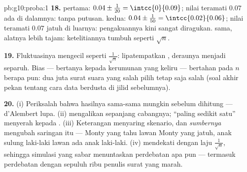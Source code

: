 \begin{solution}{pb:g10:proba:1}
\textbf{18.}  pertama:  $0.04 \pm \frac{1}{20} =
\intcc{0}{0.09}$; nilai teramati $0.07$ ada di dalamnya: tanpa putusan.
 kedua: $0.04 \pm \frac{1}{50} = \intcc{0.02}{0.06}$; nilai
teramati $0.07$ jatuh di luarnya: pengakuannya kini sangat
diragukan.  sama, alatnya lebih tajam: ketelitiannya
tumbuh seperti $\sqrt n$.

\textbf{19.} Fluktuasinya mengecil seperti $\frac{1}{\sqrt n}$:
lipatempatkan , deraunya menjadi separuh. Bias --- bertanya
kepada kerumunan yang keliru --- bertahan pada $n$ berapa pun: dua juta
surat suara yang salah pilih tetap saja salah (soal akhir pekan tentang
cara data berdusta di jilid sebelumnya).

\textbf{20.} (i) Periksalah bahwa hasilnya sama-sama mungkin sebelum
dihitung --- d'Alembert lupa. (ii)  mengalikan sepanjang
cabangnya; ``paling sedikit satu'' menyerah kepada .
(iii) Keterangan menyaring skenario, dan \emph{sumbernya}
mengubah saringan itu --- Monty yang tahu lawan Monty yang jatuh,
anak sulung laki-laki lawan ada anak laki-laki. (iv) 
mendekati  dengan laju $\frac{1}{\sqrt n}$, sehingga simulasi
yang sabar menuntaskan perdebatan apa pun --- termasuk perdebatan dengan
sepuluh ribu penulis surat yang marah.

\end{solution}
